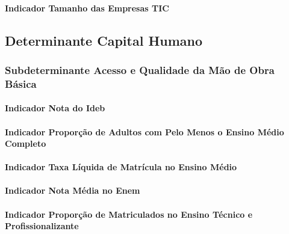\documentclass[
  12,
  dvipsnames]{article}
\begin{document}
\hypertarget{indicador-tamanho-das-empresas-tic}{%
\paragraph{Indicador Tamanho das Empresas
TIC}\label{indicador-tamanho-das-empresas-tic}}

\hypertarget{det_capital_humano}{%
\subsection{Determinante Capital Humano}\label{det_capital_humano}}

\hypertarget{subdet_obra_basica}{%
\subsubsection{Subdeterminante Acesso e Qualidade da Mão de Obra
Básica}\label{subdet_obra_basica}}

\hypertarget{indicador-nota-do-ideb}{%
\paragraph{Indicador Nota do Ideb}\label{indicador-nota-do-ideb}}

\hypertarget{indicador-proporuxe7uxe3o-de-adultos-com-pelo-menos-o-ensino-muxe9dio-completo}{%
\paragraph{Indicador Proporção de Adultos com Pelo Menos o Ensino Médio
Completo}\label{indicador-proporuxe7uxe3o-de-adultos-com-pelo-menos-o-ensino-muxe9dio-completo}}

\hypertarget{indicador-taxa-luxedquida-de-matruxedcula-no-ensino-muxe9dio}{%
\paragraph{Indicador Taxa Líquida de Matrícula no Ensino
Médio}\label{indicador-taxa-luxedquida-de-matruxedcula-no-ensino-muxe9dio}}

\hypertarget{indicador-nota-muxe9dia-no-enem}{%
\paragraph{Indicador Nota Média no
Enem}\label{indicador-nota-muxe9dia-no-enem}}

\hypertarget{indicador-proporuxe7uxe3o-de-matriculados-no-ensino-tuxe9cnico-e-profissionalizante}{%
\paragraph{Indicador Proporção de Matriculados no Ensino Técnico e
Profissionalizante}\label{indicador-proporuxe7uxe3o-de-matriculados-no-ensino-tuxe9cnico-e-profissionalizante}}
\end{document}
